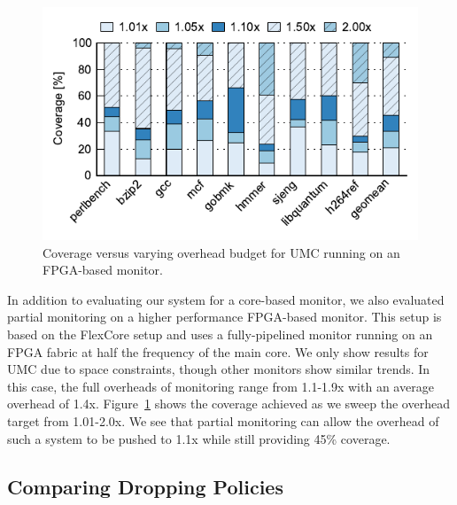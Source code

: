 \begin{figure}
  \begin{center}
    \vspace{-0.1in}
    \includegraphics[width=\linewidth]{figs/data_fpga_umc_sweep.pdf}
    \vspace{-0.2in}
    \caption{Coverage versus varying overhead budget for UMC running on an FPGA-based monitor.}
    \label{fig:evaluation.fpga_umc_sweep}
    \vspace{-0.1in}
  \end{center}
\end{figure}

In addition to evaluating our system for a core-based monitor, we also
evaluated partial monitoring on a higher performance FPGA-based monitor. This
setup is based on the FlexCore \cite{flexcore-micro10} setup and uses a
fully-pipelined monitor running on an FPGA fabric at half the frequency of the
main core. We only show results for UMC due to space constraints, though other
monitors show similar trends. In this case, the full overheads of
monitoring range from 1.1-1.9x with an average overhead of 1.4x. Figure~\ref{fig:evaluation.fpga_umc_sweep} shows
the coverage achieved as we sweep the overhead target from 1.01-2.0x. We see that partial
monitoring can allow the overhead of such a system to be pushed to 1.1x
while still providing 45\% coverage.

\subsection{Comparing Dropping Policies}

